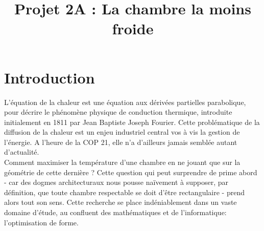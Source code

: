 \documentclass[a4paper,reqno]{article}
\begin{document}
\title{Projet 2A : La chambre la moins froide}
\maketitle
\newpage

\setlength{\parindent}{1cm}
\part*{Introduction}
L'équation de la chaleur est une équation aux dérivées partielles 
parabolique, pour décrire le phénomène physique de conduction thermique, introduite initialement en 1811 par Jean Baptiste Joseph Fourier. Cette problématique de la diffusion de la chaleur est un enjeu industriel central vos à vis la gestion de l'énergie. A l'heure de la COP 21, elle n'a d'ailleurs jamais semblée autant d'actualité. \\
Comment maximiser la température d'une chambre en ne jouant que sur la géométrie de cette dernière ? Cette question qui peut surprendre de prime abord - car des dogmes architecturaux nous pousse naïvement à supposer, par définition, que toute chambre respectable se doit d'être rectangulaire - prend alors tout son sens.
Cette recherche se place indéniablement dans un vaste domaine d'étude, au confluent des mathématiques et de l'informatique: l'optimisation de forme. \\


\end{document}
